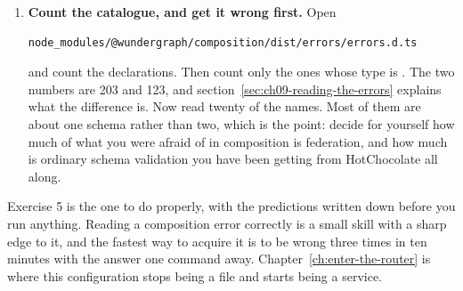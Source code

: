 \begin{enumerate}
  \item \textbf{Count the catalogue, and get it wrong first.} Open

  \begin{verbatim}
node_modules/@wundergraph/composition/dist/errors/errors.d.ts
  \end{verbatim}

  and count the declarations. Then count only the ones whose type is
  . The two numbers are 203 and 123, and
  section~\ref{sec:ch09-reading-the-errors} explains what the difference is.
  Now read twenty of the names. Most of them are about one schema rather than
  two, which is the point: decide for yourself how much of what you were afraid
  of in composition is federation, and how much is ordinary schema validation
  you have been getting from HotChocolate all along.
\end{enumerate}

Exercise 5 is the one to do properly, with the predictions written down before
you run anything. Reading a composition error correctly is a small skill with a
sharp edge to it, and the fastest way to acquire it is to be wrong three times
in ten minutes with the answer one command away.
Chapter~\ref{ch:enter-the-router} is where this configuration stops being a file
and starts being a service.
